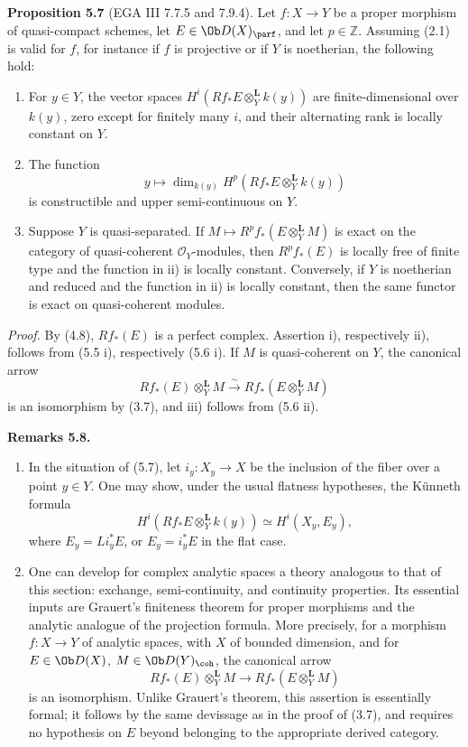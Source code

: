 \documentclass[11pt]{article}
\begin{document}
\textbf{Proposition 5.7} (EGA III 7.7.5 and 7.9.4). Let \(f:X\to Y\) be a proper morphism of quasi-compact schemes, let \(E\in\Ob D(X)_{\parf}\), and let \(p\in\mathbb Z\). Assuming (2.1) is valid for \(f\), for instance if \(f\) is projective or if \(Y\) is noetherian, the following hold:
\begin{enumerate}[label=\roman*)]
\item For \(y\in Y\), the vector spaces \(H^i(Rf_*E\otimes_Y^{\mathbf L}k(y))\) are finite-dimensional over \(k(y)\), zero except for finitely many \(i\), and their alternating rank is locally constant on \(Y\).
\item The function
\[
 y\longmapsto \dim_{k(y)}H^p(Rf_*E\otimes_Y^{\mathbf L}k(y))
\]
is constructible and upper semi-continuous on \(Y\).
\item Suppose \(Y\) is quasi-separated. If \(M\mapsto R^pf_*(E\otimes_Y^{\mathbf L}M)\) is exact on the category of quasi-coherent \(\mathcal O_Y\)-modules, then \(R^pf_*(E)\) is locally free of finite type and the function in ii) is locally constant. Conversely, if \(Y\) is noetherian and reduced and the function in ii) is locally constant, then the same functor is exact on quasi-coherent modules.
\end{enumerate}

\emph{Proof.} By (4.8), \(Rf_*(E)\) is a perfect complex. Assertion i), respectively ii), follows from (5.5 i), respectively (5.6 i). If \(M\) is quasi-coherent on \(Y\), the canonical arrow
\[
 Rf_*(E)\otimes_Y^{\mathbf L}M
 \xrightarrow{\sim}
 Rf_*(E\otimes_Y^{\mathbf L}M)
\]
is an isomorphism by (3.7), and iii) follows from (5.6 ii).

\textbf{Remarks 5.8.}
\begin{enumerate}[label=\alph*)]
\item In the situation of (5.7), let \(i_y:X_y\to X\) be the inclusion of the fiber over a point \(y\in Y\). One may show, under the usual flatness hypotheses, the Künneth formula
\[
 H^i(Rf_*E\otimes_Y^{\mathbf L}k(y))
 \simeq H^i(X_y,E_y),
\]
where \(E_y=Li_y^*E\), or \(E_y=i_y^*E\) in the flat case.
\item One can develop for complex analytic spaces a theory analogous to that of this section: exchange, semi-continuity, and continuity properties. Its essential inputs are Grauert's finiteness theorem for proper morphisms and the analytic analogue of the projection formula. More precisely, for a morphism \(f:X\to Y\) of analytic spaces, with \(X\) of bounded dimension, and for \(E\in\Ob D(X)\), \(M\in\Ob D(Y)_{\coh}\), the canonical arrow
\[
 Rf_*(E)\otimes_Y^{\mathbf L}M
 \longrightarrow
 Rf_*(E\otimes_Y^{\mathbf L}M)
\]
is an isomorphism. Unlike Grauert's theorem, this assertion is essentially formal; it follows by the same devissage as in the proof of (3.7), and requires no hypothesis on \(E\) beyond belonging to the appropriate derived category.
\end{enumerate}
\end{document}
